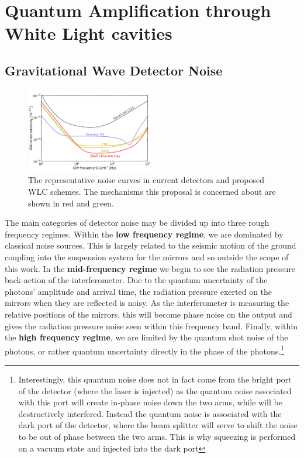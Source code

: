 \documentclass[aps,  
                a4paper, 
                amsmath, 
                amssymb, 
                preprint,
                tightenlines,  
                amsfonts,
                nofootinbib,
                onecolumn,
                titlepage,
                10pt
            ]{revtex4-2}
\begin{document}
\section{Quantum Amplification through White Light cavities}
    \subsection{Gravitational Wave Detector Noise}
    \label{sec:gwd-noise}
    \begin{figure}
        \centering
        \includegraphics[width=0.5\textwidth]{img/noise.png}
        \caption{The representative noise curves in current detectors and proposed WLC schemes. The mechanisms this proposal is concerned about are shown in red and green\cite{page2021}.}
        \label{fig:noise}
    \end{figure}
    The main categories of detector noise may be divided up into three rough frequency regimes. Within the \textbf{low frequency regime}, we are dominated by classical noise sources. This is largely related to the seismic motion of the ground coupling into the suspension system for the mirrors and so outside the scope of this work. In the \textbf{mid-frequency regime} we begin to see the radiation pressure back-action of the interferometer. Due to the quantum uncertainty of the photons' amplitude and arrival time, the radiation pressure exerted on the mirrors when they are reflected is noisy. As the interferometer is measuring the relative positions of the mirrors, this will become phase noise on the output and gives the radiation pressure noise seen within this frequency band. Finally, within the \textbf{high frequency regime}, we are limited by the quantum shot noise of the photons, or rather quantum uncertainty directly in the phase of the 
    photons.\footnote{Interestingly, this quantum noise does not in fact come from the bright port of the detector (where the laser is injected) as the quantum noise associated with this port will create in-phase noise down the two arms, while will be destructively interfered. Instead the quantum noise is associated with the dark port of the detector, where the beam splitter will serve to shift the noise to be out of phase between the two arms. This is why squeezing is performed on a vacuum state and injected into the dark port}
\end{document}
